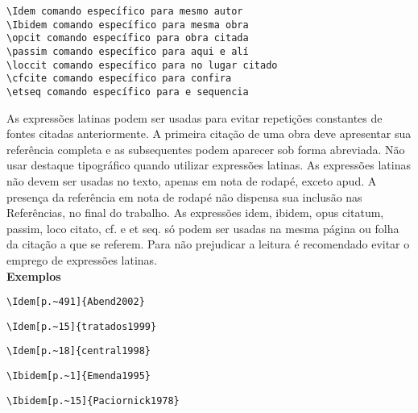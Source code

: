 \begin{alineas}

\quad

\item
\begin{verbatim}
\Idem comando específico para mesmo autor
\Ibidem comando específico para mesma obra
\opcit comando específico para obra citada
\passim comando específico para aqui e alí
\loccit comando específico para no lugar citado
\cfcite comando específico para confira
\etseq comando específico para e sequencia 
\end{verbatim} 

As expressões latinas podem ser usadas para evitar repetições constantes de fontes citadas anteriormente. A primeira citação de uma obra deve apresentar sua referência completa e as subsequentes podem aparecer sob forma abreviada. Não usar destaque tipográfico quando utilizar expressões latinas. As expressões latinas não devem ser usadas no texto, apenas em nota de rodapé, exceto apud. A presença da referência em nota de rodapé não dispensa sua inclusão nas Referências, no final do trabalho. As expressões idem, ibidem, opus citatum, passim, loco citato, cf. e et seq. só podem ser usadas na mesma página ou folha da citação a que se referem. Para não prejudicar a leitura é recomendado evitar o emprego de expressões latinas.\\

\textbf{Exemplos}

\begin{verbatim}
\Idem[p.~491]{Abend2002}
\end{verbatim}

\begin{verbatim}
\Idem[p.~15]{tratados1999}
\end{verbatim}

\begin{verbatim}
\Idem[p.~18]{central1998}
\end{verbatim}

\begin{verbatim}
\Ibidem[p.~1]{Emenda1995}
\end{verbatim}

\begin{verbatim}
\Ibidem[p.~15]{Paciornick1978}
\end{verbatim}


\end{alineas}
